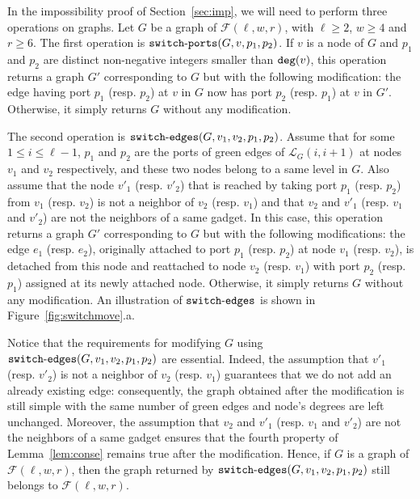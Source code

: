 \documentclass[11pt]{article}
\begin{document}

In the impossibility proof of Section~\ref{sec:imp}, we will need to perform three operations on graphs. Let $G$ be a graph of $\mathcal{F}(\ell,w,r)$, with $\ell\geq 2$, $w\geq 4$ and $r\geq 6$. The first operation is ${\tt switch\mbox{-}ports}(G,v,p_1,p_2)$. If $v$ is a node of $G$ and $p_1$ and $p_2$ are distinct non-negative integers smaller than ${\tt deg}(v)$, this operation returns a graph $G'$ corresponding to $G$ but with the following modification: the edge having port $p_1$ (resp. $p_2$) at $v$ in $G$ now has port $p_2$ (resp. $p_1$) at $v$ in $G'$. Otherwise, it simply returns $G$ without any modification.



The second operation is ${\tt switch\mbox{-}edges}(G,v_1,v_2,p_1,p_2)$. Assume that for some $1\leq i\leq \ell-1$, $p_1$ and $p_2$ are the ports of green edges of $\mathcal{L}_G(i,i+1)$ at nodes $v_1$ and $v_2$ respectively, and these two nodes belong to a same level in $G$. Also assume that the node $v'_1$ (resp. $v'_2$) that is reached by taking port $p_1$ (resp. $p_2$) from $v_1$ (resp. $v_2$) is not a neighbor of $v_2$ (resp. $v_1$) and that $v_2$ and $v'_1$ (resp. $v_1$ and $v'_2$) are not the neighbors of a same gadget. In this case, this operation returns a graph $G'$ corresponding to $G$ but with the following modifications: the edge $e_1$ (resp. $e_2$), originally attached to port $p_1$ (resp. $p_2$) at node $v_1$ (resp. $v_2$), is detached from this node and reattached to node $v_2$ (resp. $v_1$) with port $p_2$ (resp. $p_1$) assigned at its newly attached node. Otherwise, it simply returns $G$ without any modification. An illustration of ${\tt switch\mbox{-}edges}$ is shown in Figure~\ref{fig:switchmove}.a.

Notice that the requirements for modifying $G$ using ${\tt switch\mbox{-}edges}(G,v_1,v_2,p_1,p_2)$ are essential. Indeed, the assumption that $v'_1$ (resp. $v'_2$) is not a neighbor of $v_2$ (resp. $v_1$) guarantees that we do not add an already existing edge: consequently, the graph obtained after the modification  is still simple with the same number of green edges and node's degrees are left unchanged. Moreover, the assumption that   $v_2$ and $v'_1$ (resp. $v_1$ and $v'_2$) are not the neighbors of a same gadget ensures that the fourth property of Lemma~\ref{lem:conse} remains true after the modification. Hence, if $G$ is a graph of $\mathcal{F}(\ell,w,r)$, then the graph returned by ${\tt switch\mbox{-}edges}(G,v_1,v_2,p_1,p_2)$ still belongs to $\mathcal{F}(\ell,w,r)$.
\end{document}
